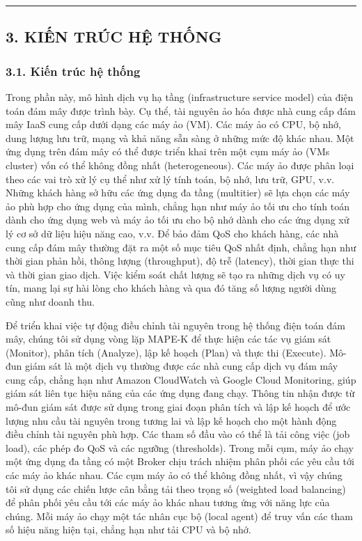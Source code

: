 \documentclass[
  vietnamese,
]{article}
\begin{document}
\begin{center}\rule{0.5\linewidth}{0.5pt}\end{center}

\subsection{3. KIẾN TRÚC HỆ
THỐNG}\label{kiux1ebfn-truxfac-hux1ec7-thux1ed1ng}

\subsubsection{3.1. Kiến trúc hệ
thống}\label{kiux1ebfn-truxfac-hux1ec7-thux1ed1ng-1}

Trong phần này, mô hình dịch vụ hạ tầng (infrastructure service model)
của điện toán đám mây được trình bày. Cụ thể, tài nguyên ảo hóa được nhà
cung cấp đám mây IaaS cung cấp dưới dạng các máy ảo (VM). Các máy ảo có
CPU, bộ nhớ, dung lượng lưu trữ, mạng và khả năng sẵn sàng ở những mức
độ khác nhau. Một ứng dụng trên đám mây có thể được triển khai trên một
cụm máy ảo (VMs cluster) vốn có thể không đồng nhất (heterogeneous). Các
máy ảo được phân loại theo các vai trò xử lý cụ thể như xử lý tính toán,
bộ nhớ, lưu trữ, GPU, v.v. Những khách hàng sở hữu các ứng dụng đa tầng
(multitier) sẽ lựa chọn các máy ảo phù hợp cho ứng dụng của mình, chẳng
hạn như máy ảo tối ưu cho tính toán dành cho ứng dụng web và máy ảo tối
ưu cho bộ nhớ dành cho các ứng dụng xử lý cơ sở dữ liệu hiệu năng cao,
v.v. Để bảo đảm QoS cho khách hàng, các nhà cung cấp đám mây thường đặt
ra một số mục tiêu QoS nhất định, chẳng hạn như thời gian phản hồi,
thông lượng (throughput), độ trễ (latency), thời gian thực thi và thời
gian giao dịch. Việc kiểm soát chất lượng sẽ tạo ra những dịch vụ có uy
tín, mang lại sự hài lòng cho khách hàng và qua đó tăng số lượng người
dùng cũng như doanh thu.

Để triển khai việc tự động điều chỉnh tài nguyên trong hệ thống điện
toán đám mây, chúng tôi sử dụng vòng lặp MAPE-K để thực hiện các tác vụ
giám sát (Monitor), phân tích (Analyze), lập kế hoạch (Plan) và thực thi
(Execute). Mô-đun giám sát là một dịch vụ thường được các nhà cung cấp
dịch vụ đám mây cung cấp, chẳng hạn như Amazon CloudWatch và Google
Cloud Monitoring, giúp giám sát liên tục hiệu năng của các ứng dụng đang
chạy. Thông tin nhận được từ mô-đun giám sát được sử dụng trong giai
đoạn phân tích và lập kế hoạch để ước lượng nhu cầu tài nguyên trong
tương lai và lập kế hoạch cho một hành động điều chỉnh tài nguyên phù
hợp. Các tham số đầu vào có thể là tải công việc (job load), các phép đo
QoS và các ngưỡng (thresholds). Trong mỗi cụm, máy ảo chạy một ứng dụng
đa tầng có một Broker chịu trách nhiệm phân phối các yêu cầu tới các máy
ảo khác nhau. Các cụm máy ảo có thể không đồng nhất, vì vậy chúng tôi sử
dụng các chiến lược cân bằng tải theo trọng số (weighted load balancing)
để phân phối yêu cầu tới các máy ảo khác nhau tương ứng với năng lực của
chúng. Mỗi máy ảo chạy một tác nhân cục bộ (local agent) để truy vấn các
tham số hiệu năng hiện tại, chẳng hạn như tải CPU và bộ nhớ.
\end{document}
